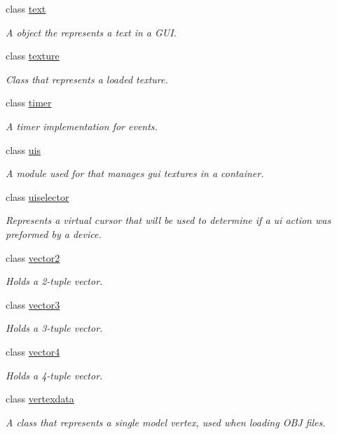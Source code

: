 \begin{DoxyCompactItemize}
class \hyperlink{classflounder_1_1text}{text}
\begin{DoxyCompactList}\small\item\em A object the represents a text in a G\+UI. \end{DoxyCompactList}\item 
class \hyperlink{classflounder_1_1texture}{texture}
\begin{DoxyCompactList}\small\item\em Class that represents a loaded texture. \end{DoxyCompactList}\item 
class \hyperlink{classflounder_1_1timer}{timer}
\begin{DoxyCompactList}\small\item\em A timer implementation for events. \end{DoxyCompactList}\item 
class \hyperlink{classflounder_1_1uis}{uis}
\begin{DoxyCompactList}\small\item\em A module used for that manages gui textures in a container. \end{DoxyCompactList}\item 
class \hyperlink{classflounder_1_1uiselector}{uiselector}
\begin{DoxyCompactList}\small\item\em Represents a virtual cursor that will be used to determine if a ui action was preformed by a device. \end{DoxyCompactList}\item 
class \hyperlink{classflounder_1_1vector2}{vector2}
\begin{DoxyCompactList}\small\item\em Holds a 2-\/tuple vector. \end{DoxyCompactList}\item 
class \hyperlink{classflounder_1_1vector3}{vector3}
\begin{DoxyCompactList}\small\item\em Holds a 3-\/tuple vector. \end{DoxyCompactList}\item 
class \hyperlink{classflounder_1_1vector4}{vector4}
\begin{DoxyCompactList}\small\item\em Holds a 4-\/tuple vector. \end{DoxyCompactList}\item 
class \hyperlink{classflounder_1_1vertexdata}{vertexdata}
\begin{DoxyCompactList}\small\item\em A class that represents a single model vertex, used when loading O\+BJ files. \end{DoxyCompactList}\end{DoxyCompactItemize}

